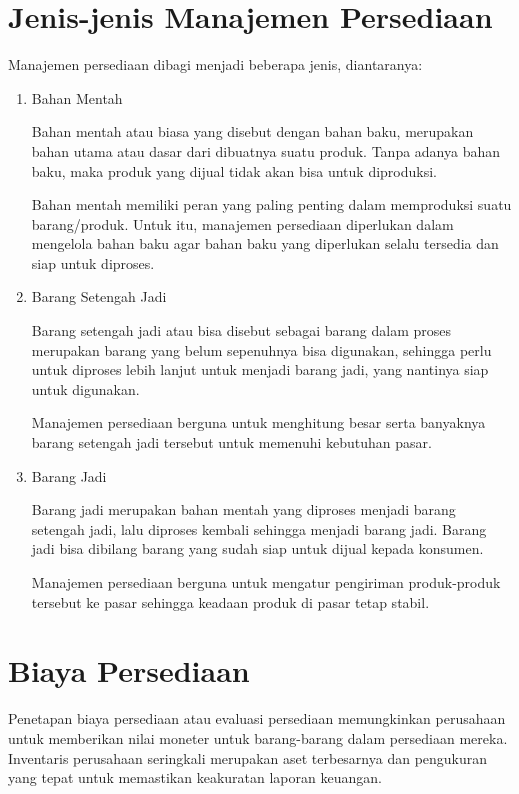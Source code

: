 \section{Jenis-jenis Manajemen Persediaan}

Manajemen persediaan dibagi menjadi beberapa jenis, diantaranya:

\begin{enumerate}
	\item Bahan Mentah
	
	Bahan mentah atau biasa yang disebut dengan bahan baku, merupakan bahan utama atau dasar dari dibuatnya suatu produk. Tanpa adanya bahan baku, maka produk yang dijual tidak akan bisa untuk diproduksi.

	Bahan mentah memiliki peran yang paling penting dalam memproduksi suatu barang/produk. Untuk itu, manajemen persediaan diperlukan dalam mengelola bahan baku agar bahan baku yang diperlukan selalu tersedia dan siap untuk diproses.
	
	\item Barang Setengah Jadi
	
	Barang setengah jadi atau bisa disebut sebagai barang dalam proses merupakan barang yang belum sepenuhnya bisa digunakan, sehingga perlu untuk diproses lebih lanjut untuk menjadi barang jadi, yang nantinya siap untuk digunakan.

	Manajemen persediaan berguna untuk menghitung besar serta banyaknya barang setengah jadi tersebut untuk memenuhi kebutuhan pasar.

	\item Barang Jadi
	
	Barang jadi merupakan bahan mentah yang diproses menjadi barang setengah jadi, lalu diproses kembali sehingga menjadi barang jadi. Barang jadi bisa dibilang barang yang sudah siap untuk dijual kepada konsumen.

	Manajemen persediaan berguna untuk mengatur pengiriman produk-produk tersebut ke pasar sehingga keadaan produk di pasar tetap stabil.
\end{enumerate}

\section{Biaya Persediaan}

Penetapan biaya persediaan atau evaluasi persediaan memungkinkan perusahaan untuk memberikan nilai moneter untuk barang-barang dalam persediaan mereka. Inventaris perusahaan seringkali merupakan aset terbesarnya dan pengukuran yang tepat untuk memastikan keakuratan laporan keuangan.

